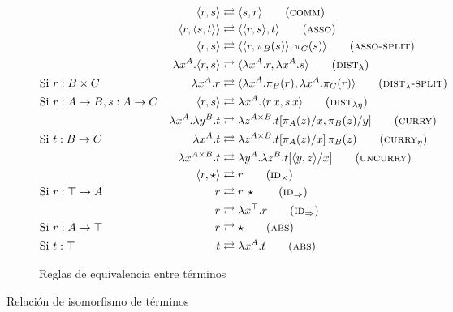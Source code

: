 \begin{figure}[H]
	\centering
	\begin{align}
		& &\langle r,s \rangle &\rightleftarrows \langle s,r \rangle \tag{\textsc{comm}} \\
		& &\langle r, \langle s,t \rangle \rangle &\rightleftarrows \langle \langle r, s \rangle, t \rangle 	\tag{\textsc{asso}} \\
		& &\langle r, s \rangle &\rightleftarrows \langle \langle r, \pi_B (s) \rangle, \pi_C (s) \rangle 	\tag{\textsc{asso-split}} \\
		& &\lambda x^A. \langle r,s \rangle &\rightleftarrows \langle \lambda x^A.r, \lambda x^A.s \rangle 	\tag{$\textsc{dist}_{\lambda}$} \\
		&\text{Si } r: B \times C &\lambda x^A. r &\rightleftarrows \langle \lambda x^A. \pi_B(r), \lambda x^A.\pi_C(r) \rangle \tag{$\textsc{dist}_{\lambda}\textsc{-split}$} \\
		&\text{Si } r: A \rightarrow B, s : A \rightarrow C &\langle r,s \rangle &\rightleftarrows \lambda x^A. \langle r \, x,s \, x \rangle \tag{$\textsc{dist}_{\lambda\eta}$} \\
		& &\lambda x^A. \lambda y^B. t &\rightleftarrows \lambda z^{A \times B}. t[\pi_A(z)/x, \pi_B(z)/y]
		\tag{\textsc{curry}} \\
		&\text{Si } t: B \rightarrow C &\lambda x^A. t &\rightleftarrows \lambda z^{A \times B}. t[\pi_A(z)/x]\, \pi_B(z) \tag{$\textsc{curry}_{\eta}$} \\
		& &\lambda x^{A \times B}. t &\rightleftarrows \lambda y^A. \lambda z^B. t[\langle y, z \rangle/x] \tag{\textsc{uncurry}} \\
		& &\langle r, \star \rangle &\rightleftarrows r \tag{$\textsc{id}_\times$} \\
		&\text{Si } r: \top \rightarrow A &r &\rightleftarrows r \, \star \tag{$\textsc{id}_\Rightarrow$} \\
		& &r &\rightleftarrows \lambda x^\top. r \tag{$\textsc{id}_\Rightarrow$} \\
		&\text{Si } r: A \rightarrow \top &r &\rightleftarrows \star \tag{\textsc{abs}} \\
		&\text{Si } t: \top &t &\rightleftarrows \lambda x^A. t \tag{\textsc{abs}}
	\end{align}
	
	\caption{Reglas de equivalencia entre términos}
\end{figure}

\begin{codigo}
	Relación de isomorfismo de términos
	
\end{codigo}

